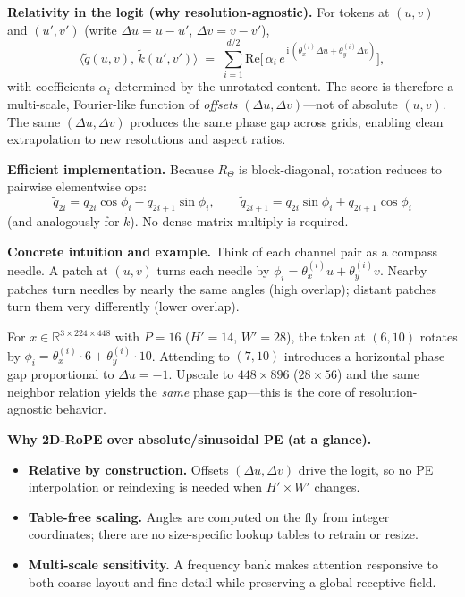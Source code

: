 \begin{enrichment}
\begin{enrichment}
        \textbf{Relativity in the logit (why resolution\mbox{-}agnostic).} \;
        For tokens at $(u,v)$ and $(u',v')$ (write $\Delta u{=}u{-}u'$, $\Delta v{=}v{-}v'$),
        \[
        \big\langle \tilde q(u,v),\,\tilde k(u',v') \big\rangle
        \;=\;
        \sum_{i=1}^{d/2} \mathrm{Re}\!\Big[\,\alpha_i \, e^{\,\mathrm{i}\,(\theta_x^{(i)}\Delta u + \theta_y^{(i)}\Delta v)} \Big],
        \]
        with coefficients $\alpha_i$ determined by the unrotated content. The score is therefore a multi\mbox{-}scale, Fourier\mbox{-}like function of \emph{offsets} $(\Delta u,\Delta v)$—not of absolute $(u,v)$. The same $(\Delta u,\Delta v)$ produces the same phase gap across grids, enabling clean extrapolation to new resolutions and aspect ratios.
        
        \textbf{Efficient implementation.} \;
        Because $R_{\Theta}$ is block\mbox{-}diagonal, rotation reduces to pairwise elementwise ops:
        \[
        \tilde q_{2i} = q_{2i}\cos\phi_i - q_{2i+1}\sin\phi_i,\qquad
        \tilde q_{2i+1} = q_{2i}\sin\phi_i + q_{2i+1}\cos\phi_i
        \]
        (and analogously for $\tilde k$). No dense matrix multiply is required.
        
        \textbf{Concrete intuition and example.} \;
        Think of each channel pair as a compass needle. A patch at $(u,v)$ turns each needle by $\phi_i=\theta_x^{(i)}u+\theta_y^{(i)}v$. Nearby patches turn needles by nearly the same angles (high overlap); distant patches turn them very differently (lower overlap). 
        
        \newpage
        
        For $x\!\in\!\mathbb{R}^{3\times224\times448}$ with $P{=}16$ ($H'\!=\!14$, $W'\!=\!28$), the token at $(6,10)$ rotates by $\phi_i=\theta_x^{(i)}\!\cdot\!6+\theta_y^{(i)}\!\cdot\!10$. Attending to $(7,10)$ introduces a horizontal phase gap proportional to $\Delta u{=}{-}1$. Upscale to $448{\times}896$ ($28{\times}56$) and the same neighbor relation yields the \emph{same} phase gap—this is the core of resolution\mbox{-}agnostic behavior.
        
        \textbf{Why 2D\mbox{-}RoPE over absolute/sinusoidal PE (at a glance).}
        \begin{itemize}
            \item \textbf{Relative by construction.} Offsets $(\Delta u,\Delta v)$ drive the logit, so no PE interpolation or reindexing is needed when $H'\!\times W'$ changes.
            \item \textbf{Table\mbox{-}free scaling.} Angles are computed on the fly from integer coordinates; there are no size\mbox{-}specific lookup tables to retrain or resize.
            \item \textbf{Multi\mbox{-}scale sensitivity.} A frequency bank makes attention responsive to both coarse layout and fine detail while preserving a global receptive field.
        \end{itemize}
        

\end{enrichment}
\end{enrichment}
